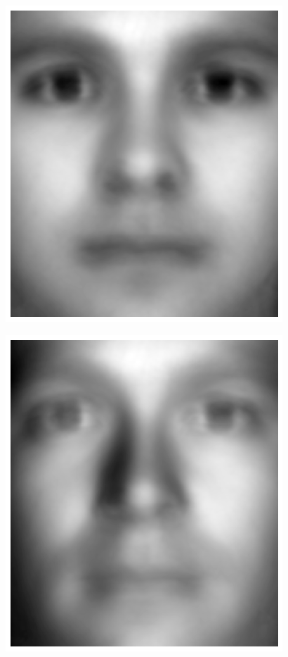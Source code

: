 \begin{minipage}[h][120mm][t]{0.35\linewidth}
\begin{center}
        \includegraphics[width=0.81\linewidth]{external_content/media/eigenfaces/correlated_face-uncentered.png}
        \captionsetup{justification=centering,type=htypei}
        \label{fig:eigenfaceCORRuncentered}
    \end{center}
    \begin{center}
        \includegraphics[width=0.81\linewidth]{external_content/media/eigenfaces/correlated_face-centered.png}
        \captionsetup{justification=centering,type=htypei}
        \label{fig:eigenfaceCORR}
    \end{center}
\end{minipage}\hfill%
